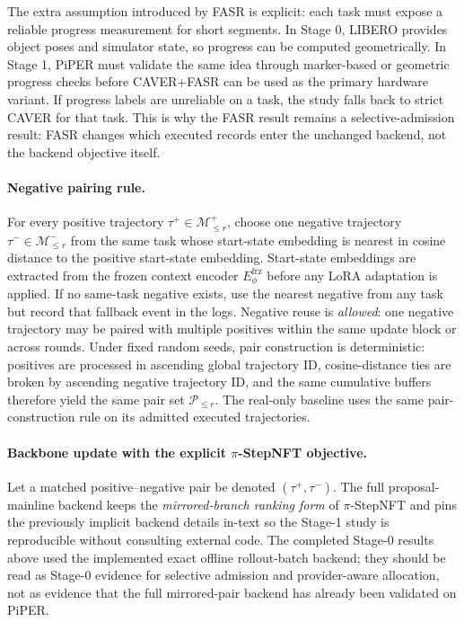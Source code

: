 \documentclass[10pt]{article}
\theoremstyle{plain}
\theoremstyle{definition}
\theoremstyle{remark}
\begin{document}
The extra assumption introduced by FASR is explicit: each task must expose a reliable progress measurement for short segments. In Stage 0, LIBERO provides object poses and simulator state, so progress can be computed geometrically. In Stage 1, PiPER must validate the same idea through marker-based or geometric progress checks before CAVER+FASR can be used as the primary hardware variant. If progress labels are unreliable on a task, the study falls back to strict CAVER for that task. This is why the FASR result remains a selective-admission result: FASR changes which executed records enter the unchanged backend, not the backend objective itself.

\paragraph{Negative pairing rule.}
For every positive trajectory $\tau^+\in\mathcal M_{\le r}^{+}$, choose one negative trajectory $\tau^-\in\mathcal M_{\le r}^{-}$ from the same task whose start-state embedding is nearest in cosine distance to the positive start-state embedding. Start-state embeddings are extracted from the frozen context encoder $E_{\phi}^{\mathrm{frz}}$ before any LoRA adaptation is applied. If no same-task negative exists, use the nearest negative from any task but record that fallback event in the logs. Negative reuse is \emph{allowed}: one negative trajectory may be paired with multiple positives within the same update block or across rounds. Under fixed random seeds, pair construction is deterministic: positives are processed in ascending global trajectory ID, cosine-distance ties are broken by ascending negative trajectory ID, and the same cumulative buffers therefore yield the same pair set $\mathcal P_{\le r}$. The real-only baseline uses the same pair-construction rule on its admitted executed trajectories.

\paragraph{Backbone update with the explicit $\pi$-StepNFT objective.}
Let a matched positive--negative pair be denoted $(\tau^+,\tau^-)$. The full proposal-mainline backend keeps the \emph{mirrored-branch ranking form} of $\pi$-StepNFT and pins the previously implicit backend details in-text so the Stage-1 study is reproducible without consulting external code. The completed Stage-0 results above used the implemented exact offline rollout-batch backend; they should be read as Stage-0 evidence for selective admission and provider-aware allocation, not as evidence that the full mirrored-pair backend has already been validated on PiPER.
\end{document}
